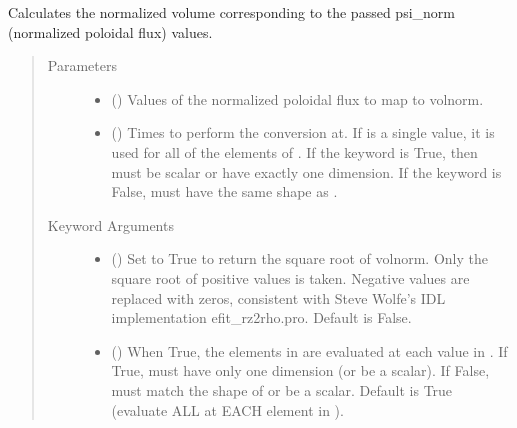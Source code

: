 \documentclass[letterpaper,10pt,english]{sphinxmanual}
\begin{document}
\begin{fulllineitems}
\begin{fulllineitems}
\label{\detokenize{eqtools:eqtools.core.Equilibrium.psinorm2volnorm}}
Calculates the normalized volume corresponding to the passed psi\_norm (normalized poloidal flux) values.
\begin{quote}\begin{description}
\item[{Parameters}] \leavevmode\begin{itemize}
\item {} 
 () \textendash{} Values of the normalized
poloidal flux to map to volnorm.

\item {} 
 () \textendash{} Times to perform the conversion at.
If  is a single value, it is used for all of the elements of
. If the  keyword is True, then  must be scalar
or have exactly one dimension. If the  keyword is False,
 must have the same shape as .

\end{itemize}

\item[{Keyword Arguments}] \leavevmode\begin{itemize}
\item {} 
 () \textendash{} Set to True to return the square root of volnorm. Only
the square root of positive values is taken. Negative values are
replaced with zeros, consistent with Steve Wolfe’s IDL
implementation efit\_rz2rho.pro. Default is False.

\item {} 
 () \textendash{} When True, the elements in  are evaluated at
each value in . If True,  must have only one dimension (or
be a scalar). If False,  must match the shape of  or be
a scalar. Default is True (evaluate ALL  at EACH element in
).


\end{itemize}
\end{description}
\end{quote}
\end{fulllineitems}
\end{fulllineitems}
\end{document}
